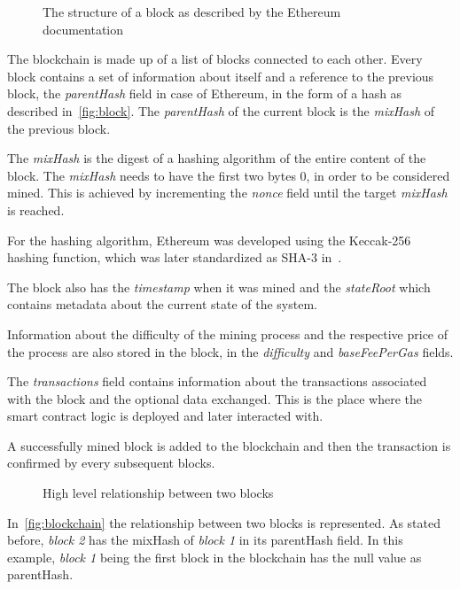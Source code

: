 \documentclass[a4paper,12pt]{report}
\begin{document}
\begin{figure}[H]
    \centering
    \scalebox{1}{}
    \caption{The structure of a block as described by the Ethereum documentation\cite{ethereumDocs}}\label{fig:block}
\end{figure}

The blockchain is made up of a list of blocks connected to each other. Every
block contains a set of information about itself and a reference to the
previous block, the \textit{parentHash} field in case of Ethereum, in the form
of a hash as described in~\autoref{fig:block}. The \textit{parentHash} of the
current block is the \textit{mixHash} of the previous block.

The \textit{mixHash} is the digest of a hashing algorithm of the entire content
of the block. The \textit{mixHash} needs to have the first two bytes 0, in
order to be considered mined. This is achieved by incrementing the
\textit{nonce} field until the target \textit{mixHash} is reached.

For the hashing algorithm, Ethereum was developed using the Keccak-256 hashing
function, which was later standardized as SHA-3 in~\cite{sha3}.

The block also has the \textit{timestamp} when it was mined and the
\textit{stateRoot} which contains metadata about the current state of the
system.

Information about the difficulty of the mining process and the respective price
of the process are also stored in the block, in the \textit{difficulty} and
\textit{baseFeePerGas} fields.

The \textit{transactions} field contains information about the transactions
associated with the block and the optional data exchanged. This is the place
where the smart contract logic is deployed and later interacted with.

A successfully mined block is added to the blockchain and then the transaction
is confirmed by every subsequent blocks.

\begin{figure}[H]
    \centering
    \scalebox{1.1}{\footnotesize}
    \caption{High level relationship between two blocks}\label{fig:blockchain}
\end{figure}

In~\autoref{fig:blockchain} the relationship between two blocks is represented.
As stated before, \textit{block 2} has the mixHash of \textit{block 1} in its
parentHash field. In this example, \textit{block 1} being the first block in
the blockchain has the null value as parentHash.
\end{document}
